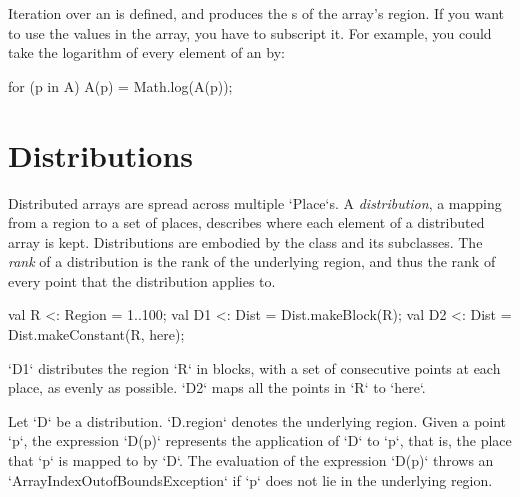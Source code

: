 Iteration over an  is defined, and produces the s of the
array's region.  If you want to use the values in the array, you have to
subscript it.  For example, you could take the logarithm of every element of an
 by: 
\begin{xten}
for (p in A) A(p) = Math.log(A(p));
\end{xten}




\section{Distributions}\label{XtenDistributions}

Distributed arrays are spread across multiple \xcd`Place`s.  
A {\em distribution}, a mapping from a region to a set of places, 
describes where each element of a distributed array is kept.
Distributions are embodied by the class  and its
subclasses. 
The {\em rank} of a distribution is the rank of the underlying region, and
thus the rank of every point that the distribution applies to.


\begin{ex}
\begin{xten}
val R  <: Region = 1..100;
val D1 <: Dist = Dist.makeBlock(R);
val D2 <: Dist = Dist.makeConstant(R, here);
\end{xten}

\xcd`D1` distributes the region \xcd`R` in blocks, with a set of consecutive
points at each place, as evenly as possible.  \xcd`D2` maps all the points in
\xcd`R` to \xcd`here`.  
\end{ex}

Let \xcd`D` be a distribution. 
\xcd`D.region` 
denotes the underlying
region. 
Given a point \xcd`p`, the expression
\xcd`D(p)` represents the application of \xcd`D` to \xcd`p`, that is,
the place that \xcd`p` is mapped to by \xcd`D`. The evaluation of the
expression \xcd`D(p)` throws an \xcd`ArrayIndexOutofBoundsException`
if \xcd`p` does not lie in the underlying region.


